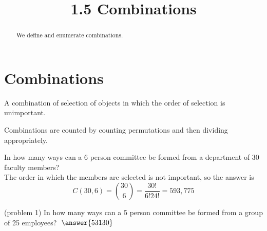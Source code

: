 \documentclass[handout]{ximera}
\title{1.5 Combinations}
\begin{document}
\begin{abstract}
We define and enumerate combinations.
\end{abstract}

\maketitle

\section{Combinations}



\begin{definition}[Combination]
A combination of selection of objects in which the order of selection is unimportant.
\end{definition}

Combinations are counted by counting permutations and then dividing appropriately.


\begin{example}[example 1]
In how many ways can a 6 person committee be formed from a department of 30 faculty members?\\
The order in which the members are selected is not important, so the answer is 
\[
C(30,6) = \binom{30}{6} = \frac{30!}{6!24!} = 593,775
\]
\end{example}

\begin{problem}(problem 1)
In how many ways can a 5 person committee be formed from a group of 25 employees? $\; \answer{53130}$\\
\end{problem}
\end{document}
